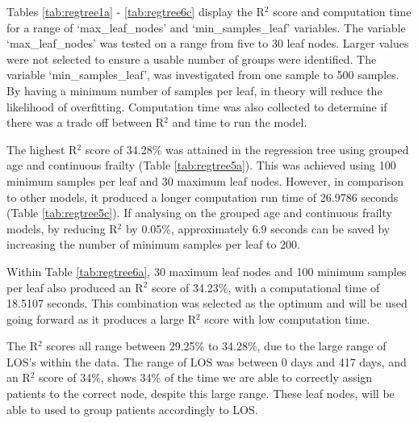 \documentclass[../thesis.tex]{subfiles}
\begin{document}
Tables \ref{tab:regtree1a} - \ref{tab:regtree6c} display the R$^{2}$ score and computation time for a range of `max\_leaf\_nodes' and `min\_samples\_leaf' variables.  The variable `max\_leaf\_nodes' was tested on a range from five to 30 leaf nodes. Larger values were not selected to ensure a usable number of groups were identified. The variable `min\_samples\_leaf', was investigated from one sample to 500 samples. By having a minimum number of samples per leaf, in theory will reduce the likelihood of overfitting. Computation time was also collected to determine if there was a trade off between R$^{2}$ and time to run the model.

The highest R$^{2}$ score of 34.28\% was attained in the regression tree using grouped age and continuous frailty (Table \ref{tab:regtree5a}). This was achieved using 100 minimum samples per leaf and 30 maximum leaf nodes. However, in comparison to other models, it produced a longer computation run time of 26.9786 seconds (Table \ref{tab:regtree5c}). If analysing on the grouped age and continuous frailty models, by reducing R$^{2}$ by 0.05\%, approximately 6.9 seconds can be saved by increasing the number of minimum samples per leaf to 200. 

Within Table \ref{tab:regtree6a}, 30 maximum leaf nodes and 100 minimum samples per leaf also produced an R$^{2}$ score of 34.23\%, with a computational time of 18.5107 seconds. This combination was selected as the optimum and will be used going forward as it produces a large R$^{2}$ score with low computation time.

The R$^{2}$ scores all range between 29.25\% to 34.28\%, due to the large range of LOS's within the data. The range of LOS was between 0 days and 417 days, and an R$^{2}$ score of 34\%, shows 34\% of the time we are able to correctly assign patients to the correct node, despite this large range. These leaf nodes, will be able to used to group patients accordingly to LOS.
\end{document}
